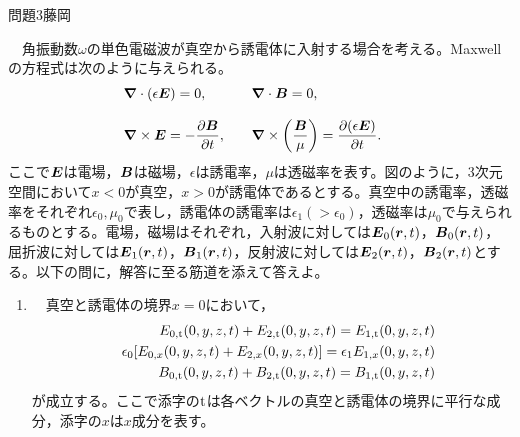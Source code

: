 \documentclass[fleqn]{jbook}
\def\ds{\displaystyle}
\def\t{\rm t}
\def\Vec#1{\mbox{\boldmath $#1$}}
\begin{document}

\begin{question}{問題3}{藤岡}
\setcounter{equation}{0}


　角振動数$\omega$の単色電磁波が真空から誘電体に入射する場合を考える。Maxwellの方程式は次のように与えられる。
$$
\begin{array}{*{20}l}
   \ds{\Vec{\nabla} \cdot (\epsilon \Vec{E})=0,} 
   &\quad \ds{\Vec{\nabla}\cdot\Vec{B}=0,}  \\
   & & \cr
   \ds{\Vec{\nabla} \times \Vec{E}=-\frac{\partial \Vec{B}}{\partial t},} 
   &\quad \ds{\Vec{\nabla} \times\left(\frac{\Vec{B}}{\mu}\right)=
\frac{\partial(\epsilon \Vec{E})}{\partial t}.}  \\
\end{array}
$$
ここで$\Vec{E}$は電場，$\Vec{B}$は磁場，$\epsilon$は誘電率，$\mu$は透磁率を表す。図のように，3次元空間において$x<0$が真空，$x>0$が誘電体であるとする。真空中の誘電率，透磁率をそれぞれ$\epsilon_0,\mu_0$で表し，誘電体の誘電率は$\epsilon_1(>\epsilon_0)$，透磁率は$\mu_0$で与えられるものとする。電場，磁場はそれぞれ，入射波に対しては$\Vec{E}_0(\Vec{r},t)$，$\Vec{B}_0(\Vec{r},t)$，屈折波に対しては$\Vec{E}_1(\Vec{r},t)$，$\Vec{B}_1(\Vec{r},t)$，反射波に対しては$\Vec{E}_2(\Vec{r},t)$，$\Vec{B}_2(\Vec{r},t)$とする。以下の問に，解答に至る筋道を添えて答えよ。

\begin{figure}[hbtp]
\begin{center}

\end{center}
\end{figure}

\begin{enumerate}
    \item　真空と誘電体の境界$x=0$において，
    \begin{eqnarray}
    &&E_{0,\t}(0,y,z,t)+E_{2,\t}(0,y,z,t)=E_{1,\t}(0,y,z,t)\\
    &&\epsilon_0[E_{0,x}(0,y,z,t)+E_{2,x}(0,y,z,t)]=\epsilon_1E_{1,x}(0,y,z,t)\\
    &&B_{0,\t}(0,y,z,t)+B_{2,\t}(0,y,z,t)=B_{1,\t}(0,y,z,t)
    \end{eqnarray}
    が成立する。ここで添字の$\t$は各ベクトルの真空と誘電体の境界に平行な成分，添字の$x$は$x$成分を表す。\\


\end{enumerate}
\end{question}
\end{document}
